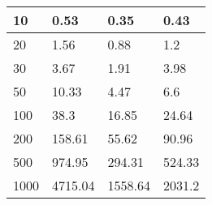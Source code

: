 \begin{table}[h]
\begin{tabular}{||l|lll||}
    10         & 0.53                                                  & 0.35                                              & 0.43                                            \\ \hline
    20         & 1.56                                                  & 0.88                                              & 1.2                                             \\ \hline
    30         & 3.67                                                  & 1.91                                              & 3.98                                            \\ \hline
    50         & 10.33                                                 & 4.47                                              & 6.6                                             \\ \hline
    100        & 38.3                                                  & 16.85                                             & 24.64                                           \\ \hline
    200        & 158.61                                                & 55.62                                             & 90.96                                           \\ \hline
    500        & 974.95                                                & 294.31                                            & 524.33                                          \\ \hline
    1000       & 4715.04                                               & 1558.64                                           & 2031.2                                          \\ \hline
    \end{tabular}
    \label{tbl:time}
    \end{table}

